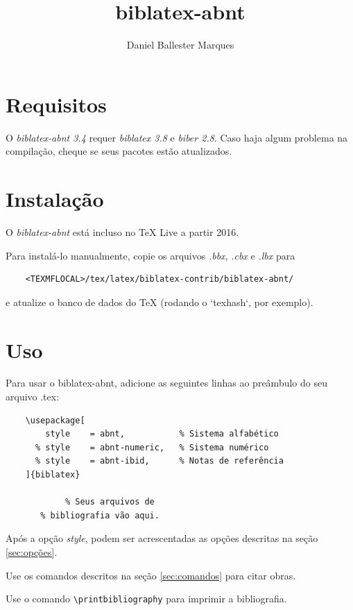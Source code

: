 \documentclass[a4paper]{article}
\title{biblatex-abnt \version}
\author{Daniel Ballester Marques}
\newcommand{\version}{3.4}
\newcommand{\requirements}{\textit{biblatex 3.8} e \textit{biber 2.8}}
\begin{document}

\maketitle

\tableofcontents

\clearpage
\section{Requisitos}%

O \textit{biblatex-abnt \version} requer \requirements. Caso haja algum
problema na compilação, cheque se seus pacotes estão atualizados.

\section{Instalação}%

O \textit{biblatex-abnt} está incluso no TeX Live a partir 2016.

Para instalá-lo manualmente, copie os arquivos \textit{.bbx}, \textit{.cbx} e
\textit{.lbx} para
\begin{verbatim}
    <TEXMFLOCAL>/tex/latex/biblatex-contrib/biblatex-abnt/
\end{verbatim}
e atualize o banco de dados do TeX (rodando o `texhash`, por exemplo).

\section{Uso}%

Para usar o {biblatex-abnt}, adicione as seguintes linhas ao preâmbulo do seu
arquivo {.tex}:

\begin{verbatim}
    \usepackage[
        style    = abnt,           % Sistema alfabético
      % style    = abnt-numeric,   % Sistema numérico
      % style    = abnt-ibid,      % Notas de referência
    ]{biblatex}

            % Seus arquivos de
       % bibliografia vão aqui.
\end{verbatim}

Após a opção \textit{style}, podem ser acrescentadas
as opções descritas na seção \ref{sec:opções}.

Use os comandos descritos na seção \ref{sec:comandos} para citar obras.

Use o comando \verb"\printbibliography" para imprimir a bibliografia.
\end{document}
